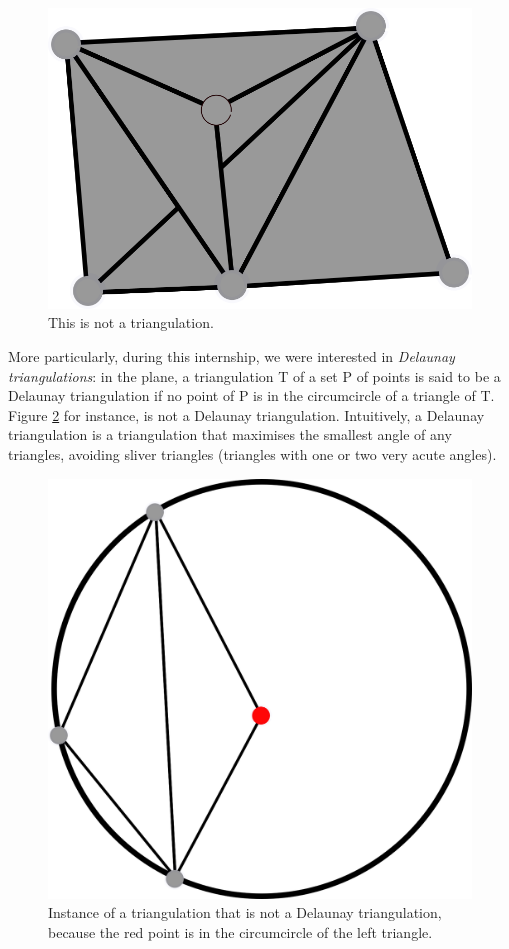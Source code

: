 \documentclass[a4paper,10pt]{article}
\begin{document}
\begin{figure}
  \centering
  \includegraphics[scale=2]{NotTrig2}
  \caption{\label{NotTrig2} This is not a triangulation.}
\end{figure}


More particularly, during this internship, we were interested in \emph{Delaunay triangulations}: in the plane, a triangulation T of a set P of points is said to be a Delaunay triangulation if no point of P is in the circumcircle of a triangle of T. Figure \ref{notDelaunay} for instance, is not a Delaunay triangulation. Intuitively, a Delaunay triangulation is a triangulation that maximises the smallest angle of any triangles, avoiding sliver triangles (triangles with one or two very acute angles).
\label{DelaunayCondition}
\begin{figure}
\centering
\includegraphics[scale=1]{dessin2}
\caption{\label{notDelaunay} Instance of a triangulation that is not a Delaunay triangulation, because the red point is in the circumcircle of the left triangle.}

\end{figure}
\end{document}
